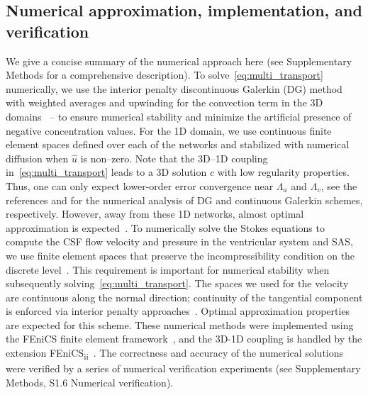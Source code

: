 \documentclass[fleqn,10pt]{wlscirep}
\begin{document}

\newcommand{\blue}[1]{\textcolor{blue}{#1}}




\subsection*{Numerical approximation, implementation, and verification}

We give a concise summary of the numerical approach here (see
Supplementary Methods for a comprehensive description). To
solve~\eqref{eq:multi_transport} numerically, we use the interior
penalty discontinuous Galerkin (DG) method with weighted averages and
upwinding for the convection term in the 3D
domains~\cite{ern2009discontinuous} -- to ensure numerical stability
and minimize the artificial presence of negative concentration
values. For the 1D domain, we use continuous finite element spaces
defined over each of the networks and stabilized with numerical
diffusion when $\hat{u}$ is non--zero. Note that the 3D--1D coupling
in~\eqref{eq:multi_transport} leads to a 3D solution $c$ with low
regularity properties. Thus, one can only expect lower-order error
convergence near $\Lambda_a$ and $\Lambda_v$, see the references
\cite{masri2024discontinuous} and \cite{laurino2019derivation} for the
numerical analysis of DG and continuous Galerkin schemes,
respectively. However, away from these 1D networks, almost optimal
approximation is
expected~\cite{masri2023discontinuous,koppl2016local}. To numerically
solve the Stokes equations to compute the CSF flow velocity and
pressure in the ventricular system and SAS, we use finite element
spaces that preserve the incompressibility condition on the discrete
level~\cite{hong2016robust}. This requirement is important for
numerical stability when subsequently
solving~\eqref{eq:multi_transport}\cite{cesmelioglu2022compatible}.
The spaces we used for the velocity are continuous along the normal
direction; continuity of the tangential component is enforced via
interior penalty approaches~\cite{hong2016robust}. Optimal
approximation properties are expected for this scheme. These numerical
methods were implemented using the FEniCS finite element
framework~\cite{alnaes2015fenics}, and the 3D-1D coupling is handled
by the extension FEniCS\textsubscript{ii}~\cite{kuchta2020assembly}.
The correctness and accuracy of the numerical solutions were verified
by a series of numerical verification experiments (see Supplementary
Methods, S1.6 Numerical verification).
\end{document}
